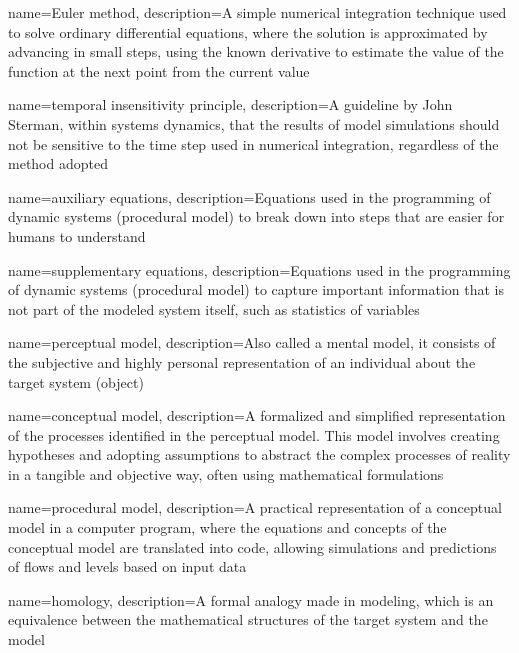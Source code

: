 {
    name=Euler method,
    description={A simple numerical integration technique used to solve ordinary differential equations, where the solution is approximated by advancing in small steps, using the known derivative to estimate the value of the function at the next point from the current value}
}

{
    name=temporal insensitivity principle,
    description={A guideline by John Sterman, within systems dynamics, that the results of model simulations should not be sensitive to the time step used in numerical integration, regardless of the method adopted}
}

{
    name=auxiliary equations,
    description={Equations used in the programming of dynamic systems (procedural model) to break down into steps that are easier for humans to understand}
}

{
    name=supplementary equations,
    description={Equations used in the programming of dynamic systems (procedural model) to capture important information that is not part of the modeled system itself, such as statistics of variables}
}

{
    name=perceptual model,
    description={Also called a mental model, it consists of the subjective and highly personal representation of an individual about the target system (object)}
}

{
    name=conceptual model,
    description={A formalized and simplified representation of the processes identified in the perceptual model. This model involves creating hypotheses and adopting assumptions to abstract the complex processes of reality in a tangible and objective way, often using mathematical formulations}
}

{
    name=procedural model,
    description={A practical representation of a conceptual model in a computer program, where the equations and concepts of the conceptual model are translated into code, allowing simulations and predictions of flows and levels based on input data}
}

{
    name=homology,
    description={A formal analogy made in modeling, which is an equivalence between the mathematical structures of the target system and the model}
}

